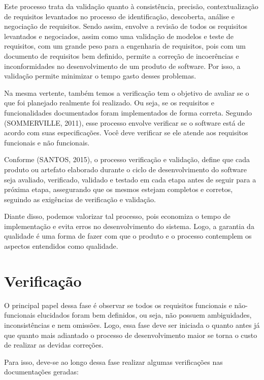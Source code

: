 \documentclass[runningheads]{llncs}
\begin{document}
Este processo trata da validação quanto à consistência, precisão, contextualização de requisitos levantados no processo de identificação, descoberta, análise e negociação de requisitos. Sendo assim, envolve a revisão de todos os requisitos levantados e negociados, assim como uma validação de modelos e teste de requisitos, com um grande peso para a engenharia de requisitos, pois com um documento de requisitos bem definido, permite a correção de incoerências e inconformidades no desenvolvimento de um produto de software. Por isso, a validação permite minimizar o tempo gasto desses problemas.

Na mesma vertente, também temos a verificação tem o objetivo de avaliar se o que foi planejado realmente foi realizado. Ou seja, se os requisitos e funcionalidades documentados foram implementados de forma correta. Segundo (SOMMERVILLE, 2011)\cite{ref_book2}, esse processo envolve verificar se o software está de acordo com suas especificações. Você deve verificar se ele atende aos requisitos funcionais e não funcionais.

Conforme (SANTOS, 2015)\cite{ref_article2}, o processo verificação e validação, define que cada produto ou artefato elaborado durante o ciclo de desenvolvimento do software seja avaliado, verificado, validado e testado em cada etapa antes de seguir para a próxima etapa, assegurando que os mesmos estejam completos e corretos, seguindo as exigências de verificação e validação. 

Diante disso, podemos valorizar tal processo, pois economiza o tempo de implementação e evita erros no desenvolvimento do sistema. Logo, a garantia da qualidade é uma forma de fazer com que o produto e o processo contemplem os aspectos entendidos como qualidade.

\section{Verificação}
O principal papel dessa fase é observar se todos os requisitos funcionais e não-funcionais elucidados foram bem definidos, ou seja, não possuem ambiguidades, inconsistências e nem omissões. Logo, essa fase deve ser iniciada o quanto antes já que quanto mais adiantado o processo de desenvolvimento maior se torna o custo de realizar as devidas correções.

Para isso, deve-se ao longo dessa fase realizar algumas verificações nas documentações geradas:
\end{document}
